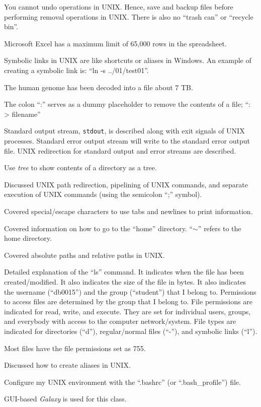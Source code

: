 You cannot undo operations in UNIX. Hence, save and backup files before performing removal operations in UNIX. There is also no ``trash can'' or ``recycle bin''.

Microsoft Excel has a maximum limit of 65,000 rows in the spreadsheet.

Symbolic links in UNIX are like shortcuts or aliases in Windows. An example of creating a symbolic link is: ``ln -s ../01/test01''.

The human genome has been decoded into a file about 7 TB.

The colon ``:'' serves as a dummy placeholder to remove the contents of a file; ``: > filename''

Standard output stream, {\tt stdout}, is described along with exit signals of UNIX processes. Standard error output stream will write to the standard error output file. UNIX redirection for standard output and error streams are described.

Use {\it tree} to show contents of a directory as a tree.

Discussed UNIX path redirection, pipelining of UNIX commands, and separate execution of UNIX commands (using the semicolon ``;'' symbol).

Covered special/escape characters to use tabs and newlines to print information.

Covered information on how to go to the ``home'' directory. ``$\sim$'' refers to the home directory.


Covered absolute paths and relative paths in UNIX.

Detailed explanation of the ``ls'' command. It indicates when the file has been created/modified. It also indicates the size of the file in bytes. It also indicates the username (``db0015'') and the group (``student'') that I belong to. Permissions to access files are determined by the group that I belong to. File permissions are indicated for read, write, and execute. They are set for individual users, groups, and everybody with access to the computer network/system. File types are indicated for directories (``d''), regular/normal files (``-''), and symbolic links (``l'').

Most files have the file permissions set as 755.

Discussed how to create aliases in UNIX.

Configure my UNIX environment with the ``.bashrc'' (or ``.bash\_profile'') file.

GUI-based {\it Galaxy} is used for this class.








